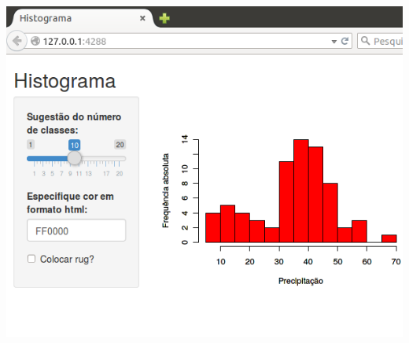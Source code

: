 \begin{frame}
\begin{columns}[t]
\begin{column}{.6\textwidth}
{{          \includegraphics[scale=0.3]{images/preview_shiny}}}
    \end{column}
  \end{columns}
\end{frame}

